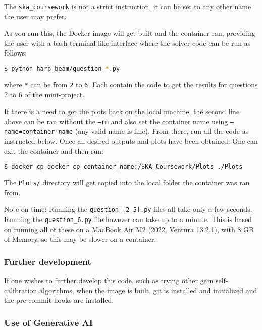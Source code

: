 \documentclass[12pt]{report} %
\begin{document}
The \texttt{ska\_coursework} is not a strict instruction, it can be set to any other name the user may prefer.

As you run this, the Docker image will get built and the container ran, providing the user with a bash terminal-like interface where the solver code can be run as follows:

\begin{lstlisting}[language=bash, caption={Running the code.}]
  $ python harp_beam/question_*.py
\end{lstlisting}

where \texttt{*} can be from \texttt{2} to \texttt{6}. Each contain the code to get the results for questions 2 to 6 of the mini-project.

If there is a need to get the plots back on the local machine, the second line above can be ran without the \texttt{--rm} and also set the container name using \texttt{--name=container\_name} (any valid name is fine). From there, run all the code as instructed below. Once all desired outputs and plots have been obtained. One can exit the container and then run:


\begin{lstlisting}[language=bash, caption={Copying the plots back to the local machine.}]
$ docker cp docker cp container_name:/SKA_Coursework/Plots ./Plots
\end{lstlisting}

The \texttt{Plots/} directory will get copied into the local folder the container was ran from.

Note on time: Running the \texttt{question\_[2-5].py} files all take only a few seconds. Running the \texttt{question\_6.py} file however can take up to a minute. This is based on running all of these on a MacBook Air M2 (2022, Ventura 13.2.1), with 8 GB of Memory, so this may be slower on a container.


\subsubsection{Further development}

If one wishes to further develop this code, such as trying other gain self-calibration algorithms, when the image is built, git is installed and initialized and the pre-commit hooks are installed.

\subsubsection{Use of Generative AI}
\end{document}

